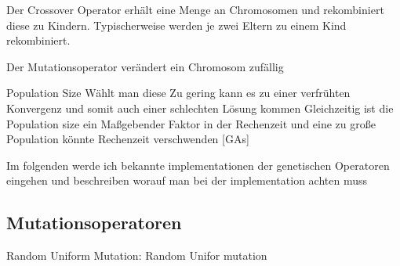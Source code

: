 Der Crossover Operator erhält eine Menge an Chromosomen und rekombiniert diese
zu Kindern.
Typischerweise werden je zwei Eltern zu einem Kind rekombiniert.


Der Mutationsoperator verändert ein Chromosom zufällig




Population Size
Wählt man diese Zu gering kann es zu einer verfrühten Konvergenz und somit auch einer schlechten Lösung kommen
Gleichzeitig ist die Population size ein Maßgebender Faktor in der Rechenzeit und eine zu große Population könnte 
Rechenzeit verschwenden [GAs]




Im folgenden werde ich bekannte implementationen der genetischen Operatoren eingehen und beschreiben worauf man bei der implementation achten muss

\subsection*{Mutationsoperatoren}
Random Uniform Mutation:
Random Unifor mutation 


